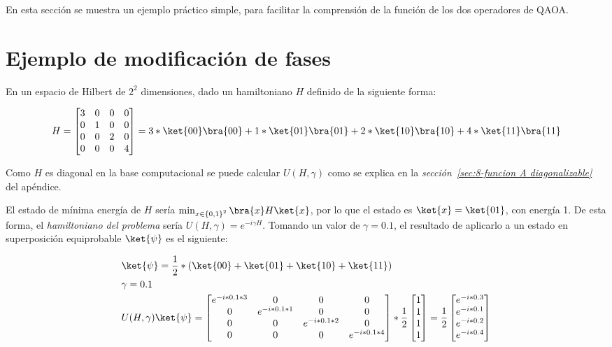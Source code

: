 En esta sección se muestra un ejemplo práctico simple, para facilitar la comprensión de la función de los dos operadores de QAOA\@.

\section{Ejemplo de modificación de fases\label{sec:8-ejemplo de modificacion de fases}}

En un espacio de Hilbert de $2^2$ dimensiones, dado un hamiltoniano $H$ definido de la siguiente forma:

\begin{align*}
  H = \begin{bmatrix}
    3 & 0 & 0 & 0 \\
    0 & 1 & 0 & 0 \\
    0 & 0 & 2 & 0 \\
    0 & 0 & 0 & 4
  \end{bmatrix} = 3*\ket{00}\bra{00} + 1*\ket{01}\bra{01} + 2*\ket{10}\bra{10} + 4*\ket{11}\bra{11}
\end{align*}

Como $H$ es diagonal en la base computacional se puede calcular $U(H, \gamma)$ como se explica en la \textit{sección~\ref{sec:8-funcion A diagonalizable}} del apéndice.

El estado de mínima energía de $H$ sería $\min_{x \in {\{0, 1\}}^2}{\bra{x}H\ket{x}}$, por lo que el estado es $\ket{x} = \ket{01}$, con energía 1.
De esta forma, el \textit{hamiltoniano del problema} sería $U(H, \gamma) = e^{-i \gamma H}$. Tomando un valor de $\gamma = 0.1$, el resultado de aplicarlo a un estado en superposición equiprobable $\ket{\psi}$ es el siguiente:

\begin{align*}
  &\ket{\psi} = \frac{1}{2}*(\ket{00} + \ket{01} + \ket{10} + \ket{11}) \\
  &\gamma = 0.1 \\
  &U(H, \gamma) \ket{\psi} =
    \begin{bmatrix}
      e^{-i * 0.1 * 3} & 0                & 0                & 0 \\
      0                & e^{-i * 0.1 * 1} & 0                & 0 \\
      0                & 0                & e^{-i * 0.1 * 2} & 0 \\
      0                & 0                & 0                & e^{-i * 0.1 * 4}
    \end{bmatrix}
    *\frac{1}{2}
    \begin{bmatrix}
      1 \\
      1 \\
      1 \\
      1
    \end{bmatrix} = \frac{1}{2}
    \begin{bmatrix}
      e^{-i * 0.3} \\
      e^{-i * 0.1} \\
      e^{-i * 0.2} \\
      e^{-i * 0.4}
    \end{bmatrix}
\end{align*}

